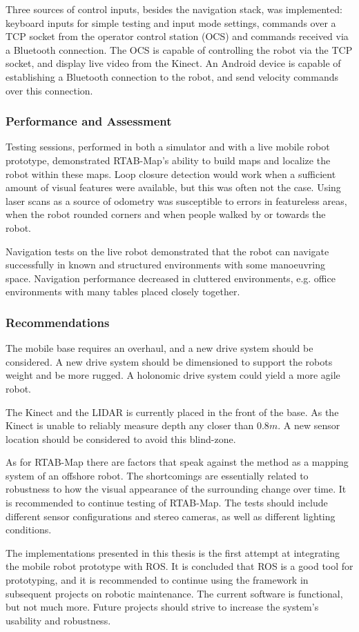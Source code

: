 Three sources of control inputs, besides the navigation stack, was implemented: keyboard inputs for simple testing and input mode settings, commands over a TCP socket from the operator control station (\ac{OCS}) and commands received via a Bluetooth connection. The \ac{OCS} is capable of controlling the robot via the TCP socket, and display live video from the Kinect. An Android device is capable of establishing a Bluetooth connection to the robot, and send velocity commands over this connection.

\subsubsection{Performance and Assessment}

Testing sessions, performed in both a simulator and with a live mobile robot prototype, demonstrated \ac{RTAB-Map}'s ability to build maps and localize the robot within these maps.  Loop closure detection would work when a sufficient amount of visual features were available, but this was often not the case. Using laser scans as a source of odometry was susceptible to errors in featureless areas, when the robot rounded corners and when people walked by or towards the robot. 

Navigation tests on the live robot demonstrated that the robot can navigate successfully in known and structured environments with some manoeuvring space. Navigation performance decreased in cluttered environments, e.g. office environments with many tables placed closely together.

\subsubsection{Recommendations}

The mobile base requires an overhaul, and a new drive system should be considered. A new drive system should be dimensioned to support the robots weight and be more rugged. A holonomic drive system could yield a more agile robot. 

The Kinect and the LIDAR is currently placed in the front of the base. As the Kinect is unable to reliably measure depth any closer than $0.8 m$. A new sensor location should be considered to avoid this blind-zone.

As for \ac{RTAB-Map} there are factors that speak against the method as a mapping system of an offshore robot. The shortcomings  are essentially related to robustness to how the visual appearance of the surrounding change over time. It is recommended to continue testing of \ac{RTAB-Map}. The tests should include different sensor configurations and stereo cameras, as well as different lighting conditions.

The implementations presented in this thesis is the first attempt at integrating the mobile robot prototype with \ac{ROS}. It is concluded that \ac{ROS} is a good tool for prototyping, and it is recommended to continue using the framework in subsequent projects on robotic maintenance. The current software is functional, but not much more. Future projects should strive to increase the system's usability and robustness.

